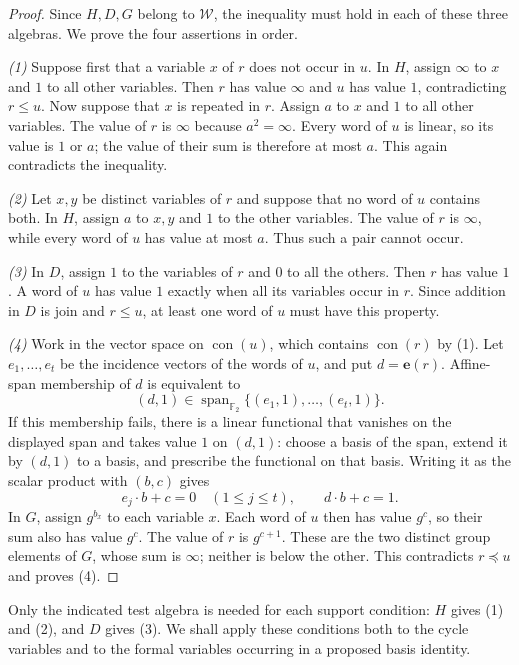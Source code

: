 \documentclass[11pt,reqno]{amsart}
\numberwithin{equation}{section}
\theoremstyle{definition}
\theoremstyle{remark}
\DeclareMathOperator{\con}{con}
\newcommand{\W}{\mathcal W}
\newcommand{\F}{\mathbb F_2}
\newcommand{\ivec}[1]{\mathbf e(#1)}
\begin{document}
\begin{proof}
Since $H,D,G$ belong to $\W$, the inequality must hold in each of
these three algebras. We prove the four assertions in order.

\emph{(1)} Suppose first that a variable $x$ of $r$ does not occur
in $u$. In $H$, assign $\infty$ to $x$ and $1$ to all other variables.
Then $r$ has value $\infty$ and $u$ has value $1$, contradicting
$r\leq u$. Now suppose that $x$ is repeated in $r$. Assign $a$ to
$x$ and $1$ to all other variables. The value of $r$ is $\infty$
because $a^2=\infty$. Every word of $u$ is linear, so its value is
$1$ or $a$; the value of their sum is therefore at most $a$.
This again contradicts the inequality.

\emph{(2)} Let $x,y$ be distinct variables of $r$ and suppose that
no word of $u$ contains both. In $H$, assign $a$ to $x,y$ and $1$
to the other variables. The value of $r$ is $\infty$, while every
word of $u$ has value at most $a$. Thus such a pair cannot occur.

\emph{(3)} In $D$, assign $1$ to the variables of $r$ and $0$ to
all the others. Then $r$ has value $1$. A word of $u$ has value $1$
exactly when all its variables occur in $r$. Since addition in $D$
is join and $r\leq u$, at least one word of $u$ must have this property.

\emph{(4)} Work in the vector space on $\con(u)$, which contains
$\con(r)$ by (1). Let $e_1,\ldots,e_t$ be the incidence vectors of
the words of $u$, and put $d=\ivec{r}$. Affine-span membership of
$d$ is equivalent to
\[
(d,1)\in\operatorname{span}_{\F}\{(e_1,1),\ldots,(e_t,1)\}.
\]
If this membership fails, there is a linear functional that vanishes
on the displayed span and takes value $1$ on $(d,1)$: choose a basis
of the span, extend it by $(d,1)$ to a basis, and prescribe the
functional on that basis. Writing it as the scalar product with
$(b,c)$ gives
\[
e_j\cdot b+c=0\quad(1\leq j\leq t),
\qquad d\cdot b+c=1.
\]
In $G$, assign $g^{b_x}$ to each variable $x$. Each word of $u$
then has value $g^c$, so their sum also has value $g^c$.
The value of $r$ is $g^{c+1}$. These are the two distinct group
elements of $G$, whose sum is $\infty$; neither is below the other.
This contradicts $r\preceq u$ and proves (4).
\end{proof}

Only the indicated test algebra is needed for each support
condition: $H$ gives (1) and (2), and $D$ gives (3).
We shall apply these conditions both to the cycle variables and
to the formal variables occurring in a proposed basis identity.
\end{document}
